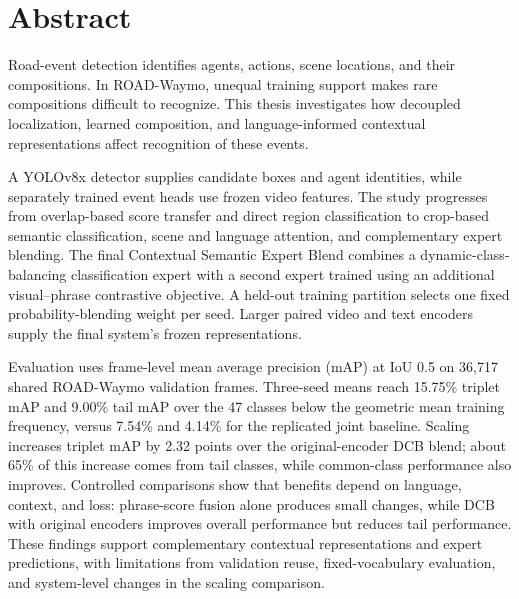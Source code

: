 \chapter*{Abstract}

Road-event detection identifies agents, actions, scene locations, and their compositions. In ROAD-Waymo, unequal training support makes rare compositions difficult to recognize. This thesis investigates how decoupled localization, learned composition, and language-informed contextual representations affect recognition of these events.

A YOLOv8x detector supplies candidate boxes and agent identities, while separately trained event heads use frozen video features. The study progresses from overlap-based score transfer and direct region classification to crop-based semantic classification, scene and language attention, and complementary expert blending. The final Contextual Semantic Expert Blend combines a dynamic-class-balancing classification expert with a second expert trained using an additional visual--phrase contrastive objective. A held-out training partition selects one fixed probability-blending weight per seed. Larger paired video and text encoders supply the final system's frozen representations.

Evaluation uses frame-level mean average precision (mAP) at IoU 0.5 on 36,717 shared ROAD-Waymo validation frames. Three-seed means reach 15.75\% triplet mAP and 9.00\% tail mAP over the 47 classes below the geometric mean training frequency, versus 7.54\% and 4.14\% for the replicated joint baseline. Scaling increases triplet mAP by 2.32 points over the original-encoder DCB blend; about 65\% of this increase comes from tail classes, while common-class performance also improves. Controlled comparisons show that benefits depend on language, context, and loss: phrase-score fusion alone produces small changes, while DCB with original encoders improves overall performance but reduces tail performance. These findings support complementary contextual representations and expert predictions, with limitations from validation reuse, fixed-vocabulary evaluation, and system-level changes in the scaling comparison.
